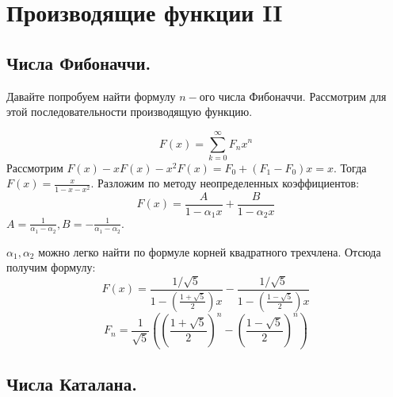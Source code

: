 \section{Производящие функции II}

\subsection{Числа Фибоначчи.}

Давайте попробуем найти формулу $n-$ого числа Фибоначчи. Рассмотрим для этой последовательности производящую функцию.

$$F(x) = \sum_{k = 0}^{\infty} F_n x^n$$
Рассмотрим $F(x) - xF(x) - x^2F(x) = F_0 + (F_1 - F_0)x = x.$ Тогда $F(x) = \frac{x}{1 - x - x^2}.$ Разложим по методу неопределенных коэффициентов:
$$F(x) = \frac{A}{1 - \alpha_1 x} + \frac{B}{1 - \alpha_2 x}$$
$A = \frac{1}{\alpha_1 - \alpha_2}, B = - \frac{1}{\alpha_1 - \alpha_2}.$

$\alpha_1, \alpha_2$ можно легко найти по формуле корней квадратного трехчлена. Отсюда получим формулу:
$$F(x) = \frac{1/\sqrt{5}}{1 - \left(\frac{1+\sqrt{5}}{2}\right) x} - \frac{1/\sqrt{5}}{1 - \left(\frac{1-\sqrt{5}}{2}\right) x}$$
$$F_n = \frac{1}{\sqrt{5}} \left( \left(\frac{1 + \sqrt{5}}{2}\right)^n - \left(\frac{1 - \sqrt{5}}{2}\right)^n \right)$$

\subsection{Числа Каталана.}

